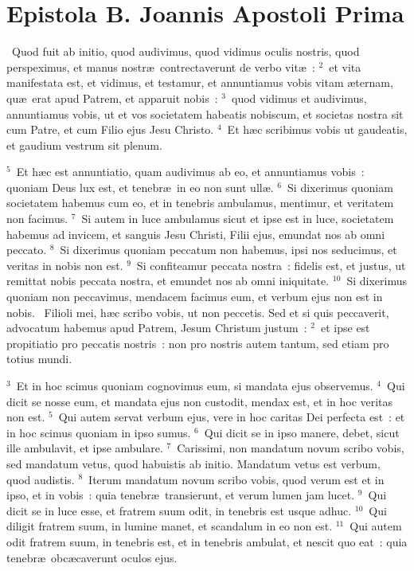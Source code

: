 \clearpage
{\centering \section*{Epistola B. Joannis Apostoli Prima}}\thispagestyle{empty}

~Quod fuit ab initio, quod audivimus, quod vidimus oculis nostris, quod perspeximus, et manus nostr\ae\ contrectaverunt de verbo vit\ae~:
${}^{2}$~et vita manifestata est, et vidimus, et testamur, et annuntiamus vobis vitam \ae ternam, qu\ae\ erat apud Patrem, et apparuit nobis~:
${}^{3}$~quod vidimus et audivimus, annuntiamus vobis, ut et vos societatem habeatis nobiscum, et societas nostra sit cum Patre, et cum Filio ejus Jesu Christo.
${}^{4}$~Et h\ae c scribimus vobis ut gaudeatis, et gaudium vestrum sit plenum.


${}^{5}$~Et h\ae c est annuntiatio, quam audivimus ab eo, et annuntiamus vobis~: quoniam Deus lux est, et tenebr\ae\ in eo non sunt ull\ae .
${}^{6}$~Si dixerimus quoniam societatem habemus cum eo, et in tenebris ambulamus, mentimur, et veritatem non facimus.
${}^{7}$~Si autem in luce ambulamus sicut et ipse est in luce, societatem habemus ad invicem, et sanguis Jesu Christi, Filii ejus, emundat nos ab omni peccato.
${}^{8}$~Si dixerimus quoniam peccatum non habemus, ipsi nos seducimus, et veritas in nobis non est.
${}^{9}$~Si confiteamur peccata nostra~: fidelis est, et justus, ut remittat nobis peccata nostra, et emundet nos ab omni iniquitate.
${}^{10}$~Si dixerimus quoniam non peccavimus, mendacem facimus eum, et verbum ejus non est in nobis.
~Filioli mei, h\ae c scribo vobis, ut non peccetis. Sed et si quis peccaverit, advocatum habemus apud Patrem, Jesum Christum justum~:
${}^{2}$~et ipse est propitiatio pro peccatis nostris~: non pro nostris autem tantum, sed etiam pro totius mundi.


${}^{3}$~Et in hoc scimus quoniam cognovimus eum, si mandata ejus observemus.
${}^{4}$~Qui dicit se nosse eum, et mandata ejus non custodit, mendax est, et in hoc veritas non est.
${}^{5}$~Qui autem servat verbum ejus, vere in hoc caritas Dei perfecta est~: et in hoc scimus quoniam in ipso sumus.
${}^{6}$~Qui dicit se in ipso manere, debet, sicut ille ambulavit, et ipse ambulare.
${}^{7}$~Carissimi, non mandatum novum scribo vobis, sed mandatum vetus, quod habuistis ab initio. Mandatum vetus est verbum, quod audistis.
${}^{8}$~Iterum mandatum novum scribo vobis, quod verum est et in ipso, et in vobis~: quia tenebr\ae\ transierunt, et verum lumen jam lucet.
${}^{9}$~Qui dicit se in luce esse, et fratrem suum odit, in tenebris est usque adhuc.
${}^{10}$~Qui diligit fratrem suum, in lumine manet, et scandalum in eo non est.
${}^{11}$~Qui autem odit fratrem suum, in tenebris est, et in tenebris ambulat, et nescit quo eat~: quia tenebr\ae\ obc\ae caverunt oculos ejus.


